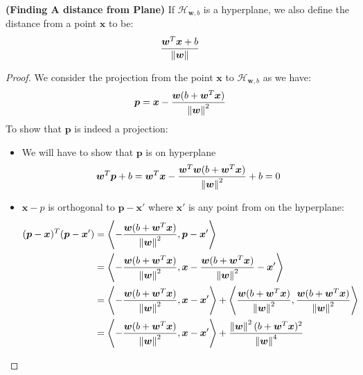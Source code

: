 \begin{proposition}{\textbf{(Finding A distance from Plane)}}
    If $\mathcal{H}_{\boldsymbol w, b}$ is a hyperplane, we also define the distance from a point $\boldsymbol x$ to be:
    \begin{equation*}
        \frac{\boldsymbol w^T\boldsymbol x + b}{\left\lVert\boldsymbol w\right\rVert}
    \end{equation*}
\end{proposition}
\begin{proof}
    We consider the projection from the point $\boldsymbol x$ to $\mathcal{H}_{\boldsymbol w, b}$ as we have:
    \begin{equation*}
        \boldsymbol p = \boldsymbol x - \frac{\boldsymbol w(b + \boldsymbol w^T\boldsymbol x)}{\left\lVert\boldsymbol w\right\rVert^2}
    \end{equation*}
    To show that $\boldsymbol p$ is indeed a projection:
    \begin{itemize}
        \item We will have to show that $\boldsymbol p$ is on hyperplane 
        \begin{equation*}
            \boldsymbol w^T\boldsymbol p + b = \boldsymbol w^T\boldsymbol x - \frac{\boldsymbol w^T\boldsymbol w(b + \boldsymbol w^T\boldsymbol x)}{\left\lVert\boldsymbol w\right\rVert^2} + b = 0
        \end{equation*}
        \item $\boldsymbol x-p$ is orthogonal to $\boldsymbol p - \boldsymbol x'$ where $\boldsymbol x'$ is any point from on the hyperplane:
        \begin{equation*}
        \begin{aligned}
        (\boldsymbol p-\boldsymbol x)^T(\boldsymbol p-\boldsymbol x')
        &= \brackd{-\frac{\boldsymbol w(b + \boldsymbol w^T\boldsymbol x)}{\norm{\boldsymbol w}^2}, \boldsymbol p - \boldsymbol x'} \\
        &= \brackd{-\frac{\boldsymbol w(b + \boldsymbol w^T\boldsymbol x)}{\norm{\boldsymbol w}^2}, \boldsymbol x - \frac{\boldsymbol w(b + \boldsymbol w^T\boldsymbol x)}{\norm{\boldsymbol w}^2} - \boldsymbol x'} \\
        &= \brackd{-\frac{\boldsymbol w(b + \boldsymbol w^T\boldsymbol x)}{\norm{\boldsymbol w}^2}, \boldsymbol x - \boldsymbol x'} + \brackd{\frac{\boldsymbol w(b + \boldsymbol w^T\boldsymbol x)}{\norm{\boldsymbol w}^2}, \frac{\boldsymbol w(b + \boldsymbol w^T\boldsymbol x)}{\norm{\boldsymbol w}^2}} \\
        &= \brackd{-\frac{\boldsymbol w(b + \boldsymbol w^T\boldsymbol x)}{\norm{\boldsymbol w}^2}, \boldsymbol x - \boldsymbol x'} + \frac{\norm{\boldsymbol w}^2(b + \boldsymbol w^T\boldsymbol x)^2}{\norm{\boldsymbol w}^4} \\

\end{aligned}
\end{equation*}
\end{itemize}
\end{proof}
